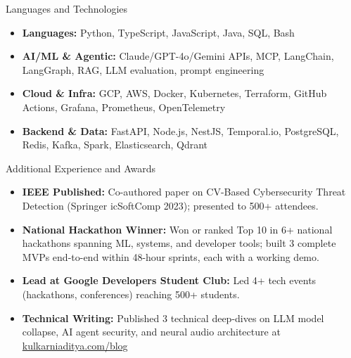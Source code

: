 \documentclass[]{mcdowellcv}
\begin{document}
\begin{cvsection}{Languages and Technologies}
  \begin{cvsubsection}{}{}{}
    \begin{itemize}
      \item \textbf{Languages:} Python, TypeScript, JavaScript, Java, SQL, Bash
      \item \textbf{AI/ML \& Agentic:} Claude/GPT-4o/Gemini APIs, MCP, LangChain, LangGraph, RAG, LLM evaluation, prompt engineering
      \item \textbf{Cloud \& Infra:} GCP, AWS, Docker, Kubernetes, Terraform, GitHub Actions, Grafana, Prometheus, OpenTelemetry
      \item \textbf{Backend \& Data:} FastAPI, Node.js, NestJS, Temporal.io, PostgreSQL, Redis, Kafka, Spark, Elasticsearch, Qdrant
    \end{itemize}
  \end{cvsubsection}
\end{cvsection}

\begin{cvsection}{Additional Experience and Awards}
  \begin{cvsubsection}{}{}{}
    \begin{itemize}
      \item \textbf{IEEE Published:} Co-authored paper on CV-Based Cybersecurity Threat Detection (Springer icSoftComp 2023); presented to 500+ attendees.
      \item \textbf{National Hackathon Winner:} Won or ranked Top 10 in 6+ national hackathons spanning ML, systems, and developer tools; built 3 complete MVPs end-to-end within 48-hour sprints, each with a working demo.
      \item \textbf{Lead at Google Developers Student Club:} Led 4+ tech events (hackathons, conferences) reaching 500+ students.
      \item \textbf{Technical Writing:} Published 3 technical deep-dives on LLM model collapse, AI agent security, and neural audio architecture at \href{https://www.kulkarniaditya.com/blog}{kulkarniaditya.com/blog}
    \end{itemize}
  \end{cvsubsection}
\end{cvsection}
\end{document}
